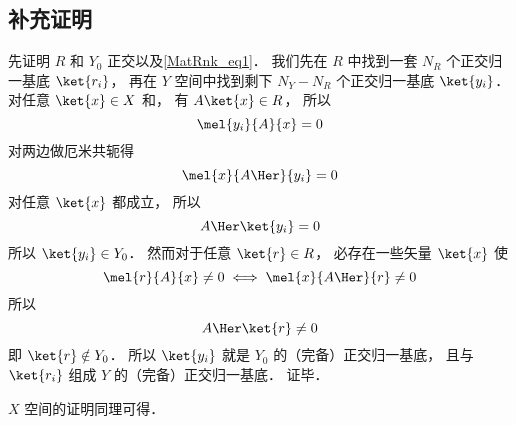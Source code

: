 \subsection{补充证明}
先证明 $R$ 和 $Y_0$ 正交以及\autoref{MatRnk_eq1}． 我们先在 $R$ 中找到一套 $N_R$ 个正交归一基底 $\ket{r_i}$， 再在 $Y$ 空间中找到剩下 $N_Y - N_R$ 个正交归一基底 $\ket{y_i}$． 对任意 $\ket{x} \in X$ 和， 有 $A \ket{x} \in R$， 所以
\begin{equation}
\mel{y_i}{A}{x} = 0
\end{equation}
对两边做厄米共轭得%
\begin{equation}
\mel{x}{A\Her}{y_i} = 0
\end{equation}
对任意 $\ket{x}$ 都成立， 所以
\begin{equation}
A\Her\ket{y_i} = 0
\end{equation}
所以 $\ket{y_i} \in Y_0$． 然而对于任意 $\ket{r} \in R$， 必存在一些矢量 $\ket{x}$ 使
\begin{equation}
\mel{r}{A}{x} \ne 0
\iff
\mel{x}{A\Her}{r} \ne 0
\end{equation}
所以
\begin{equation}
A\Her\ket{r} \ne 0
\end{equation}
即 $\ket{r} \notin Y_0$． 所以 $\ket{y_i}$ 就是 $Y_0$ 的（完备）正交归一基底， 且与 $\ket{r_i}$ 组成 $Y$ 的（完备）正交归一基底． 证毕．

$X$ 空间的证明同理可得．
